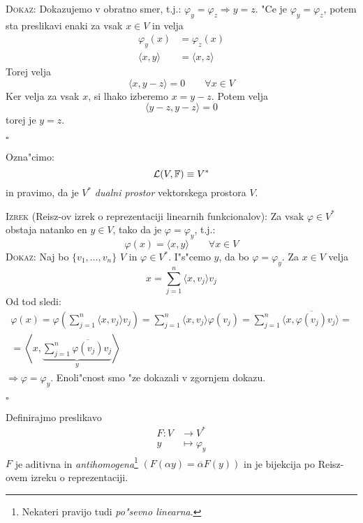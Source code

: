 \textsc{Dokaz:} Dokazujemo v obratno smer, t.j.: $\varphi_y = \varphi_z \Rightarrow y = z$. "Ce je $\varphi_y = \varphi_z$, potem sta preslikavi enaki za vsak $x \in V$ in velja
\begin{align*}
\varphi_y (x) &= \varphi_z(x) \\
\langle x, y \rangle &= \langle x, z \rangle
\end{align*}
Torej velja
\begin{equation*}
\langle x, y - z \rangle = 0 \qquad \forall x \in V
\end{equation*}
Ker velja za vsak $x$, si lhako izberemo $x = y - z$. Potem velja
\begin{equation*}
\langle y - z, y - z \rangle = 0
\end{equation*}
torej je $y = z$.

\hfill $\square$

Ozna"cimo:
\begin{equation*}
\mathcal{L} (V, \operatorname{\mathbb{F}}) \equiv V^*
\end{equation*}
in pravimo, da je $V^*$ \emph{dualni prostor} vektorskega prostora $V$.

\textsc{Izrek} (Reisz-ov izrek o reprezentaciji linearnih funkcionalov): Za vsak $\varphi \in V^*$ obstaja natanko en $y \in V$, tako da je $\varphi = \varphi_y$, t.j.:
\begin{equation*}
\varphi(x) = \langle x, y \rangle \qquad \forall x \in V
\end{equation*}
\textsc{Dokaz:} Naj bo $\{ v_1, \ldots, v_n \}$ \ONB $V$ in $\varphi \in V^*$. I"s"cemo $y$, da bo $\varphi = \varphi_y$. Za $x \in V$ velja
\begin{equation*}
x = \sum_{j=1}^n \langle x, v_j \rangle v_j
\end{equation*}
Od tod sledi:
\begin{multline*}
\varphi(x) = \varphi \left( \sum_{j=1}^n \langle x, v_j \rangle v_j \right) = \sum_{j=1}^n \langle x, v_j \rangle \varphi(v_j) = \sum_{j=1}^n \langle x, \overline{\varphi(v_j)}v_j \rangle = \\
= \left\langle x, \underbrace{\sum_{j=1}^n \overline{\varphi(v_j)} v_j}_y \right\rangle
\end{multline*}
$\Rightarrow \varphi = \varphi_y$. Enoli"cnost smo "ze dokazali v zgornjem dokazu.

\hfill $\square$

Definirajmo preslikavo
\begin{align*}
F: V &\to V^* \\
y &\mapsto \varphi_y
\end{align*}
$F$ je aditivna in \emph{antihomogena}\footnote{Nekateri pravijo tudi \emph{po"sevno linearna}.} $(F(\alpha y) = \overline{\alpha}F(y))$ in je bijekcija po Reisz-ovem izreku o reprezentaciji.

